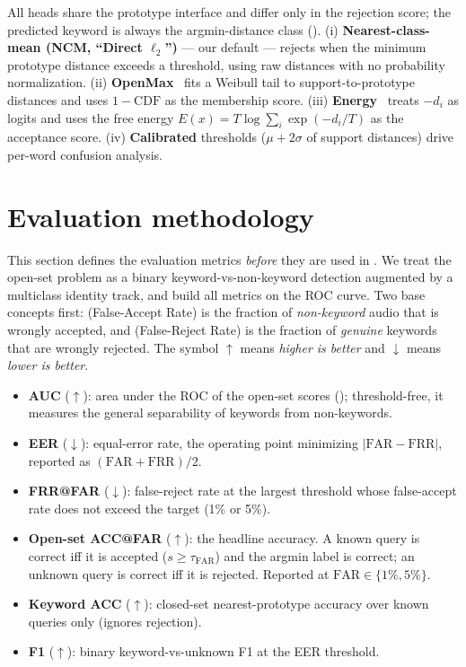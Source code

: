 \documentclass[12pt,a4paper]{report}
\newcommand{\far}{\text{FAR}}
\newcommand{\frr}{\text{FRR}}
\begin{document}
All heads share the prototype interface and differ only in the rejection score;
the predicted keyword is always the argmin-distance class ().
(i) \textbf{Nearest-class-mean (NCM, ``Direct $\ell_2$'')} --- our default ---
rejects when the minimum prototype distance exceeds a threshold, using raw
distances with no probability normalization.
(ii) \textbf{OpenMax}~\cite{bendale2016openmax} fits a Weibull tail to
support-to-prototype distances and uses $1-\mathrm{CDF}$ as the membership score.
(iii) \textbf{Energy}~\cite{liu2020energy} treats $-d_i$ as logits and uses the
free energy $E(x)=T\log\sum_i\exp(-d_i/T)$ as the acceptance score.
(iv) \textbf{Calibrated} thresholds ($\mu+2\sigma$ of support distances) drive
per-word confusion analysis.

\section{Evaluation methodology}\label{sec:eval}

This section defines the evaluation metrics \emph{before} they are used in
. We treat the open-set problem as a binary
keyword-vs-non-keyword detection augmented by a multiclass identity track, and
build all metrics on the ROC curve. Two base concepts first: \far{} (False-Accept
Rate) is the fraction of \emph{non-keyword} audio that is wrongly accepted, and
\frr{} (False-Reject Rate) is the fraction of \emph{genuine} keywords that are
wrongly rejected. The symbol $\uparrow$ means \emph{higher is better} and
$\downarrow$ means \emph{lower is better}.
\begin{itemize}[leftmargin=1.3em,itemsep=1pt]
\item \textbf{AUC} ($\uparrow$): area under the ROC of the open-set scores
(); threshold-free, it measures the general separability of
keywords from non-keywords.
\item \textbf{EER} ($\downarrow$): equal-error rate, the operating point
minimizing $|\far-\frr|$, reported as $(\far+\frr)/2$.
\item \textbf{FRR@FAR} ($\downarrow$): false-reject rate at the largest threshold
whose false-accept rate does not exceed the target (1\% or 5\%).
\item \textbf{Open-set ACC@FAR} ($\uparrow$): the headline accuracy. A known query
is correct iff it is accepted ($s\ge\tau_{\far}$) and the argmin label is correct;
an unknown query is correct iff it is rejected. Reported at $\far\in\{1\%, 5\%\}$.
\item \textbf{Keyword ACC} ($\uparrow$): closed-set nearest-prototype accuracy over
known queries only (ignores rejection).
\item \textbf{F1} ($\uparrow$): binary keyword-vs-unknown F1 at the EER threshold.
\end{itemize}
\end{document}
